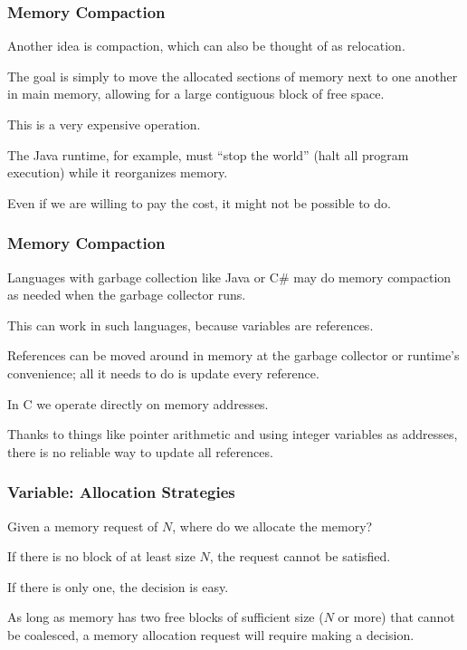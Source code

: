 \begin{frame}
\frametitle{Memory Compaction}

Another idea is \alert{compaction}, which can also be thought of as \alert{relocation}. 

The goal is simply to move the allocated sections of memory next to one another in main memory, allowing for a large contiguous block of free space. 

This is a very expensive operation. 

The Java runtime, for example, must ``stop the world'' (halt all program execution) while it reorganizes memory. 

Even if we are willing to pay the cost, it might not be possible to do.

\end{frame}

\begin{frame}
\frametitle{Memory Compaction}

Languages with garbage collection like Java or C\# may do memory compaction as needed when the garbage collector runs.

This can work in such languages, because variables are references.

References can be moved around in memory at the garbage collector or runtime's convenience; all it needs to do is update every reference.

In C we operate directly on memory addresses. 

Thanks to things like pointer arithmetic and using integer variables as addresses, there is no reliable way to update all references.


\end{frame}

\begin{frame}
\frametitle{Variable: Allocation Strategies}

Given a memory request of $N$, where do we allocate the memory? 

If there is no block of at least size $N$, the request cannot be satisfied. 

If there is only one, the decision is easy.

As long as memory has two free blocks of sufficient size ($N$ or more) that cannot be coalesced, a memory allocation request will require making a decision.


\end{frame}

